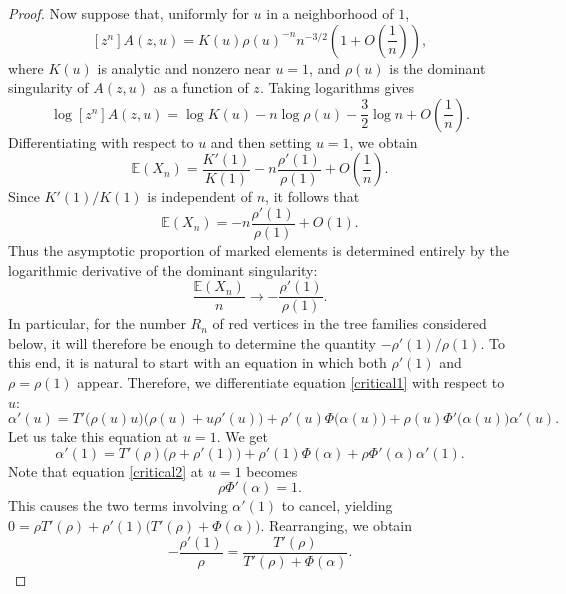 \documentclass[11pt, onesided]{amsart}
\theoremstyle{remark}
\begin{document}
\begin{proof}
Now suppose that, uniformly for \(u\) in a neighborhood of \(1\),
\[
[z^n]A(z,u)
=
K(u)\rho(u)^{-n}n^{-3/2}
\left(1+O\left(\frac{1}{n}\right)\right),
\]
where \(K(u)\) is analytic and nonzero near \(u=1\), and \(\rho(u)\) is the dominant singularity of \(A(z,u)\) as a function of \(z\). Taking logarithms gives
\[
\log [z^n]A(z,u)
=
\log K(u)
-
n\log \rho(u)
-
\frac32\log n
+
O\left(\frac{1}{n}\right).
\]
Differentiating with respect to \(u\) and then setting \(u=1\), we obtain
\[
\mathbb E(X_n)
=
\frac{K'(1)}{K(1)}
-
n\frac{\rho'(1)}{\rho(1)}
+
O\left(\frac{1}{n}\right).
\]
Since \(K'(1)/K(1)\) is independent of \(n\), it follows that
\[
\mathbb E(X_n)
=
-n\frac{\rho'(1)}{\rho(1)}
+
O(1).
\]
Thus the asymptotic proportion of marked elements is determined entirely by the logarithmic derivative of the dominant singularity:
\[
{
\frac{\mathbb E(X_n)}{n}
\longrightarrow
-\frac{\rho'(1)}{\rho(1)}.
}
\]
In particular, for the number \(R_n\) of red vertices in the tree families considered below, it will therefore be enough to determine the quantity
$-\rho'(1)/\rho(1)$.
%
%
To this end, it is natural to start with an equation in which both
$\rho'(1)$ and $\rho=\rho(1)$ appear.
Therefore, we differentiate equation \eqref{critical1} with respect to \(u\):
\[
\alpha'(u)
=
T'\big(\rho(u)u\big)
\bigl(\rho(u)+u\rho'(u)\bigr)
+
\rho'(u)\Phi\big(\alpha(u)\big)
+
\rho(u)\Phi'\big(\alpha(u)\big)\alpha'(u).
\]
Let us take this equation at $u=1$.
We get \[\alpha'(1)=T'(\rho)\big(\rho+\rho'(1)\big) + \rho'(1)\Phi(\alpha)
+
\rho\Phi'(\alpha)\alpha'(1).
\]
Note  that
 equation \eqref{critical2} at $u=1$ becomes
\begin{equation}\label{eq:char}
\rho\Phi'(\alpha)=1.
\end{equation}
This 
causes the two terms involving \(\alpha'(1)\) to cancel, yielding
$
0
=
\rho T'(\rho)
+
\rho'(1)
\bigl(T'(\rho)+\Phi(\alpha)\bigr).
$
Rearranging, we obtain
\begin{equation} \label{theratio}
-\frac{\rho'(1)}{\rho}
=
\frac{T'(\rho)}
{T'(\rho)+\Phi(\alpha)}.
\end{equation}


\end{proof}
\end{document}
